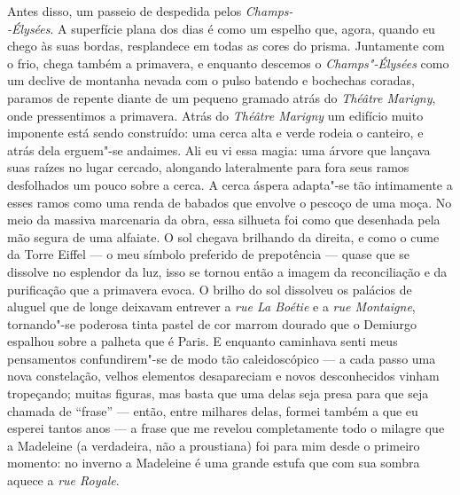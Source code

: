 Antes disso, um passeio de despedida pelos \emph{Champs-\\-Élysées}. A superfície
plana dos dias é como um espelho que, agora, quando eu chego às suas
bordas, resplandece em todas as cores do prisma. Juntamente com o frio,
chega também a primavera, e enquanto descemos o \emph{Champs"-Élysées} como um
declive de montanha nevada com o pulso batendo e bochechas coradas,
paramos de repente diante de um pequeno gramado atrás do \emph{Théâtre
Marigny}, onde pressentimos a primavera. Atrás do \emph{Théâtre Marigny} um edifício
muito imponente está sendo construído: uma cerca alta e verde rodeia o canteiro,
e atrás dela erguem"-se andaimes. Ali eu vi essa magia: uma árvore que
lançava suas raízes no lugar cercado, alongando lateralmente para fora
seus ramos desfolhados um pouco sobre a cerca. A cerca áspera adapta"-se tão intimamente a esses ramos como uma renda de babados que envolve o pescoço de uma moça. No meio da massiva marcenaria da obra, essa silhueta foi como que desenhada pela mão segura de uma alfaiate. O sol chegava
brilhando da direita, e como o cume da Torre Eiffel --- o meu símbolo
preferido de prepotência --- quase que se dissolve no esplendor da luz, isso se tornou então a imagem da reconciliação e da purificação que a primavera evoca. O brilho do sol dissolveu os palácios de aluguel que de longe
deixavam entrever a \emph{rue La Boétie} e a \emph{rue Montaigne},
tornando"-se poderosa tinta pastel de cor marrom dourado que o Demiurgo
espalhou sobre a palheta que é Paris. E enquanto caminhava senti meus
pensamentos confundirem"-se de modo tão caleidoscópico --- a cada passo
uma nova constelação, velhos elementos desapareciam e novos
desconhecidos vinham tropeçando; muitas figuras, mas basta que uma delas seja presa para que seja chamada de ``frase'' --- então, entre milhares
delas, formei também a que eu esperei tantos anos --- a frase que
me revelou completamente todo o milagre que a Madeleine (a verdadeira, não
a proustiana) foi para mim desde o primeiro momento: no inverno a
Madeleine é uma grande estufa que com sua sombra aquece a \emph{rue
Royale}.
